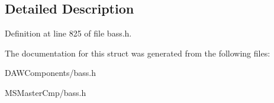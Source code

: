 \subsection{Detailed Description}


Definition at line 825 of file bass.\-h.



The documentation for this struct was generated from the following files\-:\begin{DoxyCompactItemize}
\item 
D\-A\-W\-Components/bass.\-h\item 
M\-S\-Master\-Cmp/bass.\-h\end{DoxyCompactItemize}
